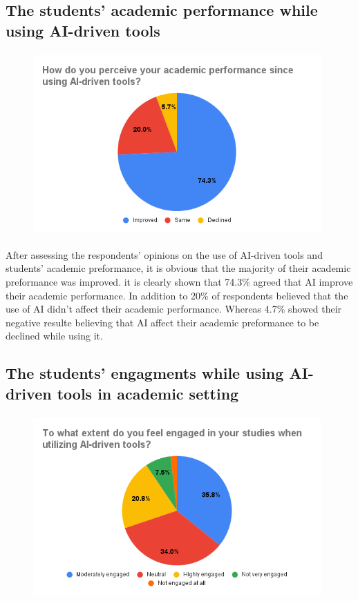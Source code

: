 \subsection{The students' academic performance while using AI-driven tools}
\begin{figure}[h]
	\centering
	\includegraphics[width=11cm, height=7cm]{./chap4/figures/prf}
\end{figure}
After assessing the respondents’ opinions on the use of AI-driven tools
and students' academic preformance, it is obvious that the majority
of their academic preformance was improved. it is clearly shown that
74.3\% agreed that AI improve their academic performance. In addition to
20\% of respondents believed that the use of AI didn't affect their academic
performance. Whereas 4.7\% showed their negative resulte believing that AI
affect their academic preformance to be declined while using it.

\subsection{The students' engagments while using AI-driven tools in academic setting}

\begin{figure}[H]
	\centering
	\includegraphics[width=11cm, height=7cm]{./chap4/figures/engagment}
\end{figure}


